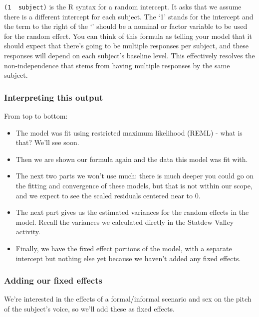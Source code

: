 \documentclass[
  openany]{book}
\providecommand{\tightlist}{%
  \setlength{\itemsep}{0pt}\setlength{\parskip}{0pt}}
\begin{document}
\texttt{(1\ \textbar{}\ subject)} is the R syntax for a random intercept. It asks that we assume there is a different intercept for each subject. The `1' stands for the intercept and the term to the right of the `\textbar{}' should be a nominal or factor variable to be used for the random effect. You can think of this formula as telling your model that it should expect that there's going to be multiple responses per subject, and these responses will depend on each subject's baseline level. This effectively resolves the non-independence that stems from having multiple responses by the same subject.

\hypertarget{interpreting-this-output}{%
\subsubsection{Interpreting this output}\label{interpreting-this-output}}

From top to bottom:

\begin{itemize}
\tightlist
\item
  The model was fit using restricted maximum likelihood (REML) - what is that? We'll see soon.\\
\item
  Then we are shown our formula again and the data this model was fit with.
\item
  The next two parts we won't use much: there is much deeper you could go on the fitting and convergence of these models, but that is not within our scope, and we expect to see the scaled residuals centered near to 0.
\item
  The next part gives us the estimated variances for the random effects in the model. Recall the variances we calculated diretly in the Statdew Valley activity.
\item
  Finally, we have the fixed effect portions of the model, with a separate intercept but nothing else yet because we haven't added any fixed effects.
\end{itemize}

\hypertarget{adding-our-fixed-effects}{%
\subsubsection{Adding our fixed effects}\label{adding-our-fixed-effects}}

We're interested in the effects of a formal/informal scenario and sex on the pitch of the subject's voice, so we'll add these as fixed effects.
\end{document}
